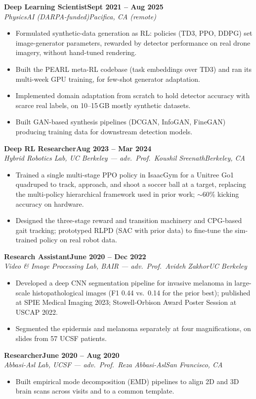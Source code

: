 \documentclass[10pt]{article}
\newcommand{\role}[4]{\textbf{#1}\hfill\textbf{#2}\\\textit{#3}\hfill\textit{#4}}
\begin{document}
\role{Deep Learning Scientist}{Sept 2021 -- Aug 2025}{PhysicsAI (DARPA-funded)}{Pacifica, CA (remote)}
\begin{itemize}
\item Formulated synthetic-data generation as RL: policies (TD3, PPO, DDPG) set image-generator parameters, rewarded by detector performance on real drone imagery, without hand-tuned rendering.
\item Built the PEARL meta-RL codebase (task embeddings over TD3) and ran its multi-week GPU training, for few-shot generator adaptation.
\item Implemented domain adaptation from scratch to hold detector accuracy with scarce real labels, on 10--15\,GB mostly synthetic datasets.
\item Built GAN-based synthesis pipelines (DCGAN, InfoGAN, FineGAN) producing training data for downstream detection models.
\end{itemize}

\role{Deep RL Researcher}{Aug 2023 -- Mar 2024}{Hybrid Robotics Lab, UC Berkeley --- adv.\ Prof.\ Koushil Sreenath}{Berkeley, CA}
\begin{itemize}
\item Trained a single multi-stage PPO policy in IsaacGym for a Unitree Go1 quadruped to track, approach, and shoot a soccer ball at a target, replacing the multi-policy hierarchical framework used in prior work; $\sim$60\% kicking accuracy on hardware.
\item Designed the three-stage reward and transition machinery and CPG-based gait tracking; prototyped RLPD (SAC with prior data) to fine-tune the sim-trained policy on real robot data.
\end{itemize}

\role{Research Assistant}{June 2020 -- Dec 2022}{Video \& Image Processing Lab, BAIR --- adv.\ Prof.\ Avideh Zakhor}{UC Berkeley}
\begin{itemize}
\item Developed a deep CNN segmentation pipeline for invasive melanoma in large-scale histopathological images (F1 0.44 vs.\ 0.14 for the prior best); published at SPIE Medical Imaging 2023; Stowell-Orbison Award Poster Session at USCAP 2022.
\item Segmented the epidermis and melanoma separately at four magnifications, on slides from 57 UCSF patients.
\end{itemize}

\role{Researcher}{June 2020 -- Aug 2020}{Abbasi-Asl Lab, UCSF --- adv.\ Prof.\ Reza Abbasi-Asl}{San Francisco, CA}
\begin{itemize}
\item Built empirical mode decomposition (EMD) pipelines to align 2D and 3D brain scans across visits and to a common template.
\end{itemize}
\end{document}
